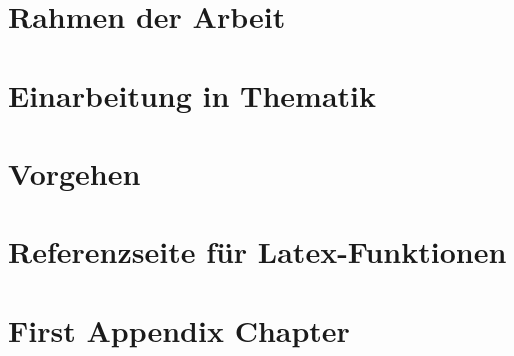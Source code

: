 \documentclass[
  a4paper,
  BCOR=15mm,            %
  twoside,
  bibliography=totoc,   %
  listof=totoc,         %
  monolingual,
  invert-title,
]{bfhthesis}
\begin{document}
\maketitle


\tableofcontents

\mainmatter

\chapter{Rahmen der Arbeit} \label{Rahmen der Arbeit}


\chapter{Einarbeitung in Thematik} \label{Einarbeitung in Thematik}




\chapter{Vorgehen} \label{Vorgehen}



\chapter{Referenzseite für Latex-Funktionen} 


\declarationOfAuthorship

\clearpage


\listoffigures
 
\listoftables
 
\lstlistoflistings 
 
\printglossary

\clearpage
\printindex
\appendix
\chapter{First Appendix Chapter}
\end{document}
